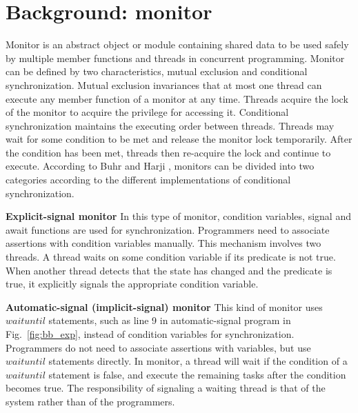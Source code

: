 \documentclass[preprint]{sigplanconf}
\begin{document}
\section{Background: monitor} \label{sec:bg} 
Monitor is an abstract object or module containing shared data to be used safely
by multiple member functions and threads in concurrent programming. Monitor can
be defined by two characteristics, mutual exclusion and conditional 
synchronization. Mutual exclusion invariances that at most one thread can 
execute any member function of a monitor at any time.  Threads  acquire the lock of the monitor 
to acquire the privilege for accessing it. Conditional synchronization 
maintains the executing order between threads. Threads may wait for some 
condition to be met and release the monitor lock temporarily. After the 
condition has been met, threads then re-acquire the lock and continue to 
execute. According to Buhr and Harji \cite{bh05}, monitors can be divided into 
two categories according to the different implementations of conditional 
synchronization. 
\begin{description}
    \item{\bf Explicit-signal monitor} In this type of monitor, condition
    variables, signal and await functions are used for synchronization. 
    Programmers need to associate assertions with condition variables manually.
    This mechanism involves two threads. A thread  waits on some condition variable 
    if its predicate is not true. When another thread detects that the state has 
    changed and the predicate is true, it explicitly signals the 
    appropriate condition variable.
    \item{\bf Automatic-signal (implicit-signal) monitor} This kind of monitor 
    uses $waituntil$
    statements, such as line 9 in automatic-signal program in
    Fig.~\ref{fig:bb_exp}, instead of condition variables for
    synchronization. Programmers do not need to associate assertions with
    variables, but use $waituntil$ statements directly. In
    monitor, a thread will wait if the condition of a $waituntil$
    statement is false, and execute the remaining tasks after the condition 
    becomes true. The responsibility of signaling a waiting thread is that of 
    the system rather than of the programmers. 
\end{description}
\end{document}
